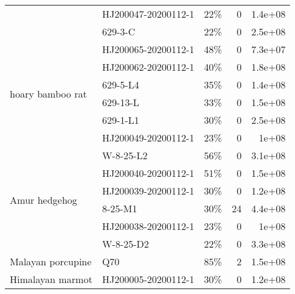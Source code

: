 \begin{tabular}{llrrr}
                 & HJ200047-20200112-1 &                                         22\% &                        0 &                   1.4e+08 \\
                 & 629-3-C &                                         22\% &                        0 &                   2.5e+08 \\
\cline{1-5}
\multirow{6}{*}{hoary bamboo rat} & HJ200065-20200112-1 &                                         48\% &                        0 &                   7.3e+07 \\
                 & HJ200062-20200112-1 &                                         40\% &                        0 &                   1.8e+08 \\
                 & 629-5-L4 &                                         35\% &                        0 &                   1.4e+08 \\
                 & 629-13-L &                                         33\% &                        0 &                   1.5e+08 \\
                 & 629-1-L1 &                                         30\% &                        0 &                   2.5e+08 \\
                 & HJ200049-20200112-1 &                                         23\% &                        0 &                     1e+08 \\
\cline{1-5}
\multirow{6}{*}{Amur hedgehog} & W-8-25-L2 &                                         56\% &                        0 &                   3.1e+08 \\
                 & HJ200040-20200112-1 &                                         51\% &                        0 &                   1.5e+08 \\
                 & HJ200039-20200112-1 &                                         30\% &                        0 &                   1.2e+08 \\
                 & 8-25-M1 &                                         30\% &                       24 &                   4.4e+08 \\
                 & HJ200038-20200112-1 &                                         23\% &                        0 &                     1e+08 \\
                 & W-8-25-D2 &                                         22\% &                        0 &                   3.3e+08 \\
\cline{1-5}
Malayan porcupine & Q70 &                                         85\% &                        2 &                   1.5e+08 \\
Himalayan marmot & HJ200005-20200112-1 &                                         30\% &                        0 &                   1.2e+08 \\
\bottomrule
\end{tabular}

